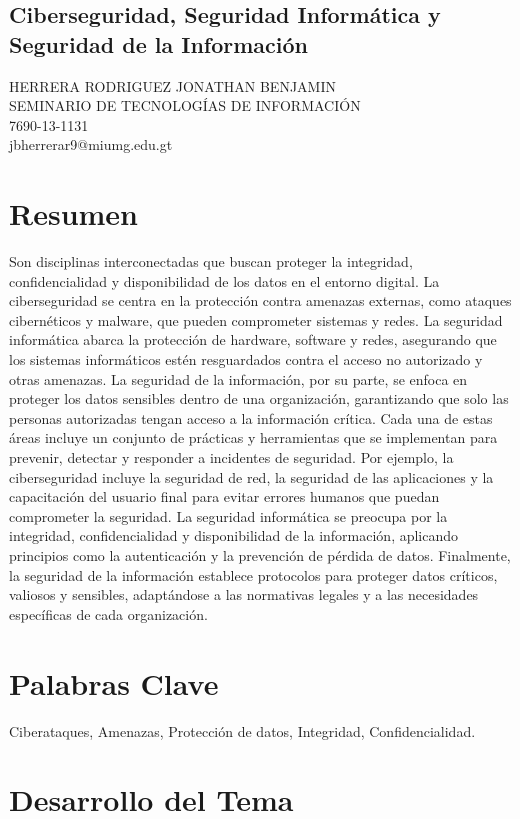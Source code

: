 \documentclass[12pt]{article}
\begin{document}
\begin{center}
\section*{Ciberseguridad, Seguridad Informática y Seguridad de la Información}
HERRERA RODRIGUEZ JONATHAN BENJAMIN
\\SEMINARIO DE TECNOLOGÍAS DE INFORMACIÓN
\\7690-13-1131
\\jbherrerar9@miumg.edu.gt
\end{center}
\section{Resumen}

Son disciplinas interconectadas que buscan proteger la integridad, confidencialidad y disponibilidad de los datos en el entorno digital. La ciberseguridad se centra en la protección contra amenazas externas, como ataques cibernéticos y malware, que pueden comprometer sistemas y redes. La seguridad informática abarca la protección de hardware, software y redes, asegurando que los sistemas informáticos estén resguardados contra el acceso no autorizado y otras amenazas. La seguridad de la información, por su parte, se enfoca en proteger los datos sensibles dentro de una organización, garantizando que solo las personas autorizadas tengan acceso a la información crítica.
Cada una de estas áreas incluye un conjunto de prácticas y herramientas que se implementan para prevenir, detectar y responder a incidentes de seguridad. Por ejemplo, la ciberseguridad incluye la seguridad de red, la seguridad de las aplicaciones y la capacitación del usuario final para evitar errores humanos que puedan comprometer la seguridad. La seguridad informática se preocupa por la integridad, confidencialidad y disponibilidad de la información, aplicando principios como la autenticación y la prevención de pérdida de datos. Finalmente, la seguridad de la información establece protocolos para proteger datos críticos, valiosos y sensibles, adaptándose a las normativas legales y a las necesidades específicas de cada organización.


\section{Palabras Clave}
Ciberataques, Amenazas, Protección de datos, Integridad, Confidencialidad.

\section{Desarrollo del Tema}
\end{document}

